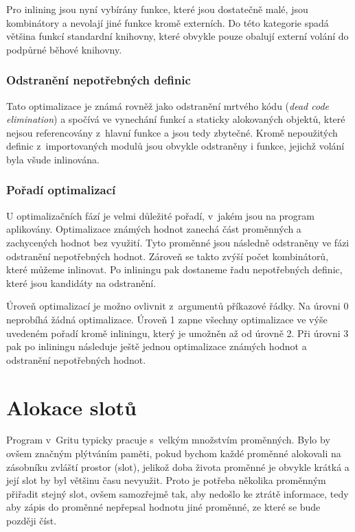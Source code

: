 Pro inlining jsou nyní vybírány funkce, které jsou dostatečně malé, jsou
kombinátory a nevolají jiné funkce kromě externích. Do této kategorie spadá
většina funkcí standardní knihovny, které obvykle pouze obalují externí volání
do podpůrné běhové knihovny.

\subsubsection{Odstranění nepotřebných definic}

Tato optimalizace je známá rovněž jako odstranění mrtvého kódu (\emph{dead code
elimination}) a spočívá ve vynechání funkcí a staticky alokovaných objektů,
které nejsou referencovány z~hlavní funkce a jsou tedy zbytečné. Kromě
nepoužitých definic z~importovaných modulů jsou obvykle odstraněny i funkce,
jejichž volání byla všude inlinována.

\subsubsection{Pořadí optimalizací}

U optimalizačních fází je velmi důležité pořadí, v~jakém jsou na program
aplikovány. Optimalizace známých hodnot zanechá část proměnných a zachycených
hodnot bez využití. Tyto proměnné jsou následně odstraněny ve fázi odstranění
nepotřebných hodnot. Zároveň se takto zvýší počet kombinátorů, které můžeme
inlinovat. Po inliningu pak dostaneme řadu nepotřebných definic, které jsou
kandidáty na odstranění.

Úroveň optimalizací je možno ovlivnit z~argumentů příkazové řádky. Na úrovni 0
neprobíhá žádná optimalizace. Úroveň 1 zapne všechny optimalizace ve výše
uvedeném pořadí kromě inliningu, který je umožněn až od úrovně 2. Při úrovni 3
pak po inliningu následuje ještě jednou optimalizace známých hodnot a odstranění
nepotřebných hodnot.

\section{Alokace slotů}

Program v~Gritu typicky pracuje s~velkým množstvím proměnných. Bylo by ovšem
značným plýtváním paměti, pokud bychom každé proměnné alokovali na zásobníku
zvláští prostor (slot), jelikož doba života proměnné je obvykle krátká a její
slot by byl většinu času nevyužit. Proto je potřeba několika proměnným přiřadit
stejný slot, ovšem samozřejmě tak, aby nedošlo ke ztrátě informace, tedy aby
zápis do proměnné nepřepsal hodnotu jiné proměnné, ze které se bude později
číst.

